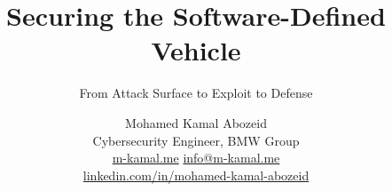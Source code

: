 \documentclass[aspectratio=169,11pt]{beamer}
\title{Securing the Software-Defined Vehicle}
\subtitle{From Attack Surface to Exploit to Defense}
\author{Mohamed Kamal Abozeid \\[2pt] {\small Cybersecurity Engineer, BMW Group} \\[2pt] {\small \url{m-kamal.me} \;\textbullet\; \href{mailto:info@m-kamal.me}{info@m-kamal.me}} \\[2pt] {\small \href{https://www.linkedin.com/in/mohamed-kamal-abozeid-814985b4/}{linkedin.com/in/mohamed-kamal-abozeid}}}
\institute{Munich}
\begin{document}
\begin{frame}[plain]
  \titlepage
\end{frame}










\end{document}
